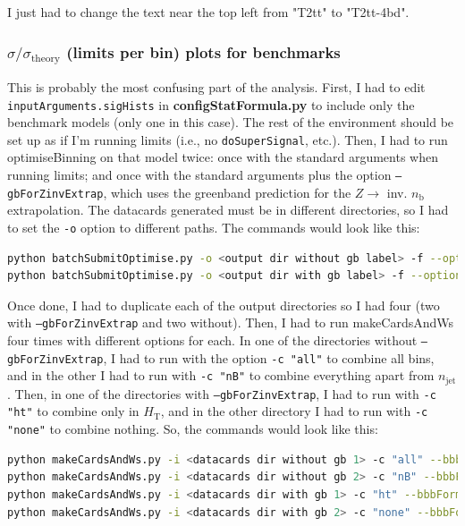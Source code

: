 I just had to change the text near the top left from "T2tt" to "T2tt-4bd".


\subsubsection{\texorpdfstring{$\sigma / \sigma_{\mathrm{theory}}$}{Sigma/sigma\_theory} (limits per bin) plots for benchmarks}

This is probably the most confusing part of the analysis. First, I had to edit \texttt{inputArguments.sigHists} in \textbf{configStatFormula.py} to include only the benchmark models (only one in this case). The rest of the environment should be set up as if I'm running limits (i.e., no \texttt{doSuperSignal}, etc.). Then, I had to run optimiseBinning on that model twice: once with the standard arguments when running limits; and once with the standard arguments plus the option \texttt{--gbForZinvExtrap}, which uses the greenband prediction for the $Z \rightarrow$ inv. $n_{\mathrm{b}}$ extrapolation. The datacards generated must be in different directories, so I had to set the \texttt{-o} option to different paths. The commands would look like this:

\begin{lstlisting}[belowskip=-0.7cm, language=sh, numbers=none]
python batchSubmitOptimise.py -o <output dir without gb label> -f --options "--shapeSystFromFile --getDataLumi --runFormula --extrapolateZinv --greenBand" --submit
python batchSubmitOptimise.py -o <output dir with gb label> -f --options "--shapeSystFromFile --getDataLumi --runFormula --extrapolateZinv --greenBand --gbForZinvExtrap" --submit
\end{lstlisting}

Once done, I had to duplicate each of the output directories so I had four (two with \texttt{--gbForZinvExtrap} and two without). Then, I had to run makeCardsAndWs four times with different options for each. In one of the directories without \texttt{--gbForZinvExtrap}, I had to run with the option \texttt{-c "all"} to combine all bins, and in the other I had to run with \texttt{-c "nB"} to combine everything apart from $n_{\mathrm{jet}}$. Then, in one of the directories with \texttt{--gbForZinvExtrap}, I had to run with \texttt{-c "ht"} to combine only in $H_{\mathrm{T}}$, and in the other directory I had to run with \texttt{-c "none"} to combine nothing. So, the commands would look like this:

\begin{lstlisting}[belowskip=-0.7cm, language=sh, numbers=none]
python makeCardsAndWs.py -i <datacards dir without gb 1> -c "all" --bbbFormulaUssr --bbbOptSig
python makeCardsAndWs.py -i <datacards dir without gb 2> -c "nB" --bbbFormulaUssr --bbbOptSig
python makeCardsAndWs.py -i <datacards dir with gb 1> -c "ht" --bbbFormulaUssr --bbbOptSig
python makeCardsAndWs.py -i <datacards dir with gb 2> -c "none" --bbbFormulaUssr --bbbOptSig
\end{lstlisting}

